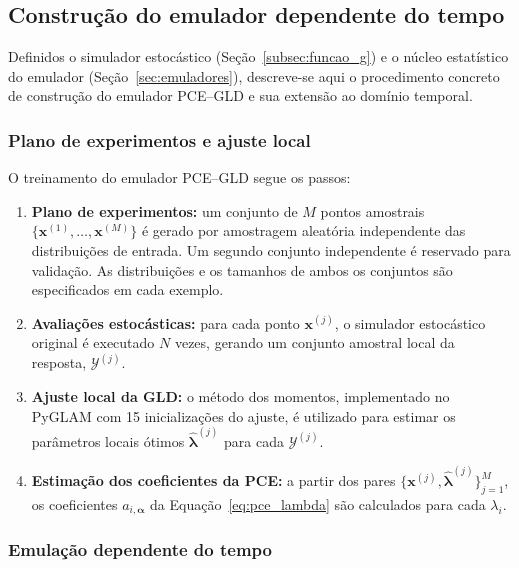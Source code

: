 \subsection{Constru\c{c}\~ao do emulador dependente do tempo}
\label{subsec:construcao_emulador}

Definidos o simulador estocástico (Seção~\ref{subsec:funcao_g}) e o núcleo estatístico do emulador (Seção~\ref{sec:emuladores}), descreve-se aqui o procedimento concreto de construção do emulador PCE--GLD e sua extensão ao domínio temporal.

\subsubsection{Plano de experimentos e ajuste local}
\label{subsub:doe}

O treinamento do emulador PCE--GLD segue os passos:

\begin{enumerate}
    \item \textbf{Plano de experimentos:} um conjunto de $M$ pontos amostrais $\{\mathbf{x}^{(1)}, \dots, \mathbf{x}^{(M)}\}$ é gerado por amostragem aleatória independente das distribuições de entrada. Um segundo conjunto independente é reservado para validação. As distribuições e os tamanhos de ambos os conjuntos são especificados em cada exemplo.
    \item \textbf{Avaliações estocásticas:} para cada ponto $\mathbf{x}^{(j)}$, o simulador estocástico original é executado $N$ vezes, gerando um conjunto amostral local da resposta, $\mathcal{Y}^{(j)}$.
    \item \textbf{Ajuste local da GLD:} o método dos momentos, implementado no PyGLAM com 15 inicializações do ajuste, é utilizado para estimar os parâmetros locais ótimos $\hat{\boldsymbol{\lambda}}^{(j)}$ para cada $\mathcal{Y}^{(j)}$.
    \item \textbf{Estimação dos coeficientes da PCE:} a partir dos pares $\{\mathbf{x}^{(j)}, \hat{\boldsymbol{\lambda}}^{(j)}\}_{j=1}^M$, os coeficientes $a_{i, \boldsymbol{\alpha}}$ da Equação~\eqref{eq:pce_lambda} são calculados para cada $\lambda_i$.
\end{enumerate}

\subsubsection{Emula\c{c}\~ao dependente do tempo}
\label{subsub:temporal}

